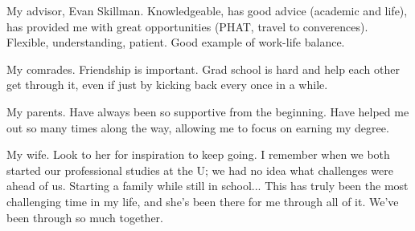 My advisor, Evan Skillman. Knowledgeable, has good advice (academic and life),
has provided me with great opportunities (PHAT, travel to converences).
Flexible, understanding, patient. Good example of work-life balance.

My comrades. Friendship is important. Grad school is hard and help each other
get through it, even if just by kicking back every once in a while.

My parents. Have always been so supportive from the beginning. Have helped me
out so many times along the way, allowing me to focus on earning my degree.

My wife. Look to her for inspiration to keep going. I remember when we both
started our professional studies at the U; we had no idea what challenges were
ahead of us. Starting a family while still in school... This has truly been the
most challenging time in my life, and she's been there for me through all of
it. We've been through so much together.
 
